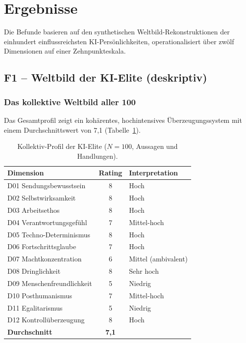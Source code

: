 \documentclass[12pt,a4paper]{article}
\begin{document}
\section{Ergebnisse}
\label{sec:ergebnisse}

Die Befunde basieren auf den synthetischen Weltbild-Rekonstruktionen der einhundert einflussreichsten KI-Pers\"onlichkeiten, operationalisiert \"uber zw\"olf Dimensionen auf einer Zehnpunkteskala.


\subsection{F1 -- Weltbild der KI-Elite (deskriptiv)}
\label{sec:ergebnisse:f1}

\subsubsection{Das kollektive Weltbild aller 100}

Das Gesamtprofil zeigt ein koh\"arentes, hochintensives \"Uberzeugungssystem mit einem Durchschnittswert von 7,1 (Tabelle~\ref{tab:kollektiv}).

\begin{table}[htbp]
  \centering
  \caption{Kollektiv-Profil der KI-Elite ($N=100$, Aussagen und Handlungen).}
  \label{tab:kollektiv}
  \begin{tabular}{l c l}
    \toprule
    \textbf{Dimension} & \textbf{Rating} & \textbf{Interpretation} \\
    \midrule
    D01 Sendungsbewusstsein  & 8 & Hoch \\
    D02 Selbstwirksamkeit    & 8 & Hoch \\
    D03 Arbeitsethos         & 8 & Hoch \\
    D04 Verantwortungsgef\"uhl & 7 & Mittel-hoch \\
    D05 Techno-Determinismus & 8 & Hoch \\
    D06 Fortschrittsglaube   & 7 & Hoch \\
    D07 Machtkonzentration   & 6 & Mittel (ambivalent) \\
    D08 Dringlichkeit        & 8 & Sehr hoch \\
    D09 Menschenfreundlichkeit & 5 & Niedrig \\
    D10 Posthumanismus       & 7 & Mittel-hoch \\
    D11 Egalitarismus        & 5 & Niedrig \\
    D12 Kontroll\"uberzeugung & 8 & Hoch \\
    \midrule
    \textbf{Durchschnitt}    & \textbf{7,1} & \\
    \bottomrule
  \end{tabular}
\end{table}
\end{document}
